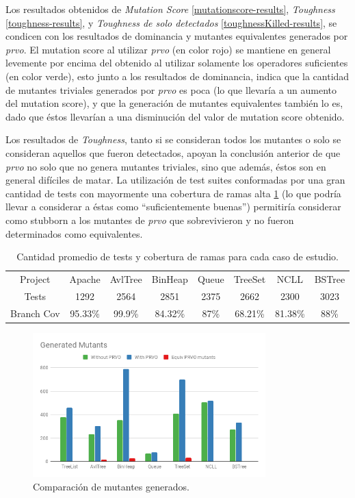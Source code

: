 Los resultados obtenidos de \emph{Mutation Score} \ref{mutationscore-results}, \emph{Toughness} \ref{toughness-results}, y \emph{Toughness de solo detectados} \ref{toughnessKilled-results}, se condicen con los resultados de dominancia y mutantes equivalentes generados por \emph{prvo}. El mutation score al utilizar \emph{prvo} (en color rojo) se mantiene en general levemente por encima del obtenido al utilizar solamente los operadores suficientes (en color verde), esto junto a los resultados de dominancia, indica que la cantidad de mutantes triviales generados por \emph{prvo} es poca (lo que llevar\'ia a un aumento del mutation score), y que la generaci\'on de mutantes equivalentes tambi\'en lo es, dado que \'estos llevar\'ian a una disminuci\'on del valor de mutation score obtenido.

Los resultados de \emph{Toughness}, tanto si se consideran todos los mutantes o solo se consideran aquellos que fueron detectados, apoyan la conclusi\'on anterior de que \emph{prvo} no solo que no genera mutantes triviales, sino que adem\'as, \'estos son en general dif\'iciles de matar. La utilizaci\'on de test suites conformadas por una gran cantidad de tests con mayormente una cobertura de ramas alta \ref{testsAndCov-results} (lo que podr\'ia llevar a considerar a \'estas como ``suficientemente buenas'') permitir\'ia considerar como stubborn a los mutantes de \emph{prvo} que sobrevivieron y no fueron determinados como equivalentes.

\begin{table}[]
	\centering
	\small
	\begin{tabular}{|c|c|c|c|c|c|c|c|}
		\hline
		Project & Apache & AvlTree & BinHeap & Queue & TreeSet & NCLL & BSTree\\ \cline{1-1}
		Tests & 1292 & 2564 & 2851 & 2375 & 2662 & 2300 & 3023\\ \cline{1-1}
		Branch Cov & 95.33\% & 99.9\% & 84.32\% & 87\% & 68.21\% & 81.38\% & 88\%\\ \hline
	\end{tabular}
	\caption{Cantidad promedio de tests y cobertura de ramas para cada caso de estudio.}
	\label{testsAndCov-results}
\end{table}

\begin{figure}
	\begin{center}
		\includegraphics[width=9cm]{figures/Generated_Mutants.png}
	\end{center}
	\caption{Comparaci\'on de mutantes generados.}
	\label{mutants-results}
\end{figure}


